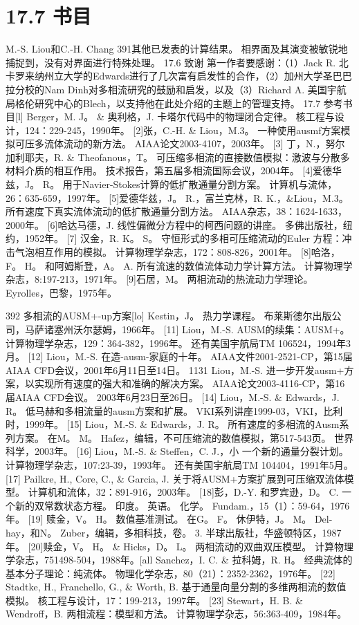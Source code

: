 \documentclass[UTF8,11pt,a4paper,openany,fontset=fandol]{ctexbook}
\begin{document}
\section{17.7 书目}
M.-S. Liou和C.-H. Chang 391其他已发表的计算结果。 相界面及其演变被敏锐地捕捉到，没有对界面进行特殊处理。 17.6 致谢 第一作者要感谢：（1）Jack R. 北卡罗来纳州立大学的Edwards进行了几次富有启发性的合作，（2）加州大学圣巴巴拉分校的Nam Dinh对多相流研究的鼓励和启发，以及（3）Richard A. 美国宇航局格伦研究中心的Blech，以支持他在此处介绍的主题上的管理支持。 17.7 参考书目[l] Berger，M. J。 \& 奥利格，J. 卡塔尔代码中的物理闭合定律。 核工程与设计，124：229-245，1990年。 [2]张，C.-H. \& Liou，M.3。 一种使用ausmf方案模拟可压多流体流动的新方法。 AIAA论文2003-4107，2003年。 [3] 丁，N.，努尔加利耶夫，R. \& Theofanous，T。 可压缩多相流的直接数值模拟：激波与分散多材料介质的相互作用。 技术报告，第五届多相流国际会议，2004年。 [4]爱德华兹，J。 R。 用于Navier-Stokes计算的低扩散通量分割方案。 计算机与流体，26：635-659，1997年。 [5]爱德华兹，J。 R.，富兰克林，R. K.，\&Liou，M.3。 所有速度下真实流体流动的低扩散通量分割方法。 AIAA杂志，38：1624-1633，2000年。 [6]哈达马德，J. 线性偏微分方程中的柯西问题的讲座。 多佛出版社，纽约，1952年。 [7] 汉金，R. K。 S。 守恒形式的多相可压缩流动的Euler 方程：冲击气泡相互作用的模拟。 计算物理学杂志，172：808-826，2001年。 [8]哈洛，F。 H。 和阿姆斯登，A。 A. 所有流速的数值流体动力学计算方法。 计算物理学杂志，8:197-213，1971年。 [9]石居，M。 两相流动的热流动力学理论。 Eyrolles，巴黎，1975年。

392 多相流的AUSM+-up方案[lo] Kestin，J。 热力学课程。 布莱斯德尔出版公司，马萨诸塞州沃尔瑟姆，1966年。 [11] Liou，M.-S. AUSM的续集：AUSM+。 计算物理学杂志，129：364-382，1996年。 还有美国宇航局TM 106524，1994年3月。 [12] Liou，M.-S. 在造-ausm-家庭的十年。 AIAA文件2001-2521-CP，第15届AIAA CFD会议，2001年6月11日至14日。 1131 Liou，M.-S. 进一步开发ausm+方案，以实现所有速度的强大和准确的解决方案。 AIAA论文2003-4116-CP，第16届AIAA CFD会议。 2003年6月23日至26日。 [14] Liou，M.-S. \& Edwards，J. R。 低马赫和多相流量的ausm方案和扩展。 VKI系列讲座1999-03，VKI，比利时，1999年。 [15] Liou，M.-S. \& Edwards，J. R。 所有速度的多相流的Ausm系列方案。 在M。 M。 Hafez，编辑，不可压缩流的数值模拟，第517-543页。 世界科学，2003年。 [16] Liou，M.-S. \& Steffen，C. J.，小 一个新的通量分裂计划。 计算物理学杂志，107:23-39，1993年。 还有美国宇航局TM 104404，1991年5月。 [17] Pailkre, H., Core, C., \& Garcia, J. 关于将AUSM+方案扩展到可压缩双流体模型。 计算机和流体，32：891-916，2003年。 [18]彭，D.-Y. 和罗宾逊，D。 C. 一个新的双常数状态方程。 印度。 英语。 化学。 Fundam.，15（1）：59-64，1976年。 [19] 赎金，V。 H。 数值基准测试。 在G。 F。 休伊特，J。 M。 Del-hay，和N。 Zuber，编辑，多相科技，卷。 3. 半球出版社，华盛顿特区，1987年。 [20]赎金，V。 H。 \& Hicks，D。 L。 两相流动的双曲双压模型。 计算物理学杂志，751498-504，1988年。[all Sanchez，I. C. \& 拉科姆，R. H。 经典流体的基本分子理论：纯流体。 物理化学杂志，80（21）：2352-2362，1976年。 [22] Stadtke, H., Franchello, G., \& Worth, B. 基于通量向量分割的多维两相流的数值模拟。 核工程与设计，17：199-213，1997年。 [23] Stewart，H. B. \& Wendroff，B. 两相流程：模型和方法。 计算物理学杂志，56:363-409，1984年。
\end{document}
